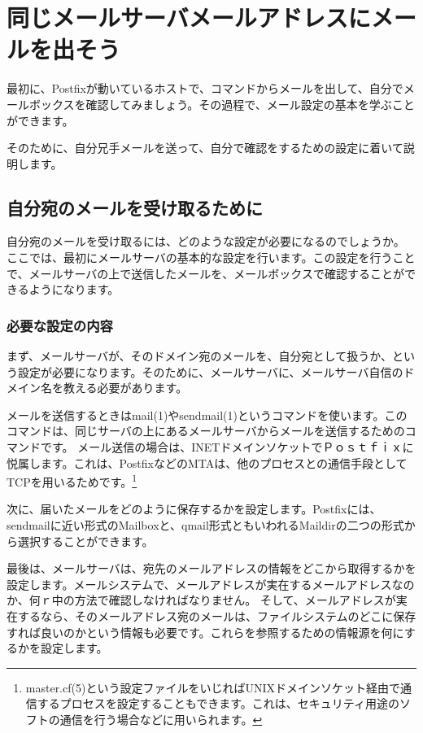 \chapter{同じメールサーバメールアドレスにメールを出そう}

最初に、Postfixが動いているホストで、コマンドからメールを出して、自分でメールボックスを確認してみましょう。その過程で、メール設定の基本を学ぶことができます。

そのために、自分兄手メールを送って、自分で確認をするための設定に着いて説明します。

\section{自分宛のメールを受け取るために}

自分宛のメールを受け取るには、どのような設定が必要になるのでしょうか。
ここでは、最初にメールサーバの基本的な設定を行います。この設定を行うことで、メールサーバの上で送信したメールを、メールボックスで確認することができるようになります。

\subsection{必要な設定の内容}

まず、メールサーバが、そのドメイン宛のメールを、自分宛として扱うか、という設定が必要になります。そのために、メールサーバに、メールサーバ自信のドメイン名を教える必要があります。

メールを送信するときはmail(1)やsendmail(1)というコマンドを使います。このコマンドは、同じサーバの上にあるメールサーバからメールを送信するためのコマンドです。
メール送信の場合は、INETドメインソケットでＰｏｓｔｆｉｘに悦属します。これは、PostfixなどのMTAは、他のプロセスとの通信手段としてTCPを用いるためです。\footnote{master.cf(5)という設定ファイルをいじればUNIXドメインソケット経由で通信するプロセスを設定することもできます。これは、セキュリティ用途のソフトの通信を行う場合などに用いられます。}

次に、届いたメールをどのように保存するかを設定します。Postfixには、sendmailに近い形式のMailboxと、qmail形式ともいわれるMaildirの二つの形式から選択することができます。

最後は、メールサーバは、宛先のメールアドレスの情報をどこから取得するかを設定します。メールシステムで、メールアドレスが実在するメールアドレスなのか、何ｒ中の方法で確認しなければなりません。
そして、メールアドレスが実在するなら、そのメールアドレス宛のメールは、ファイルシステムのどこに保存すれば良いのかという情報も必要です。これらを参照するための情報源を何にするかを設定します。

